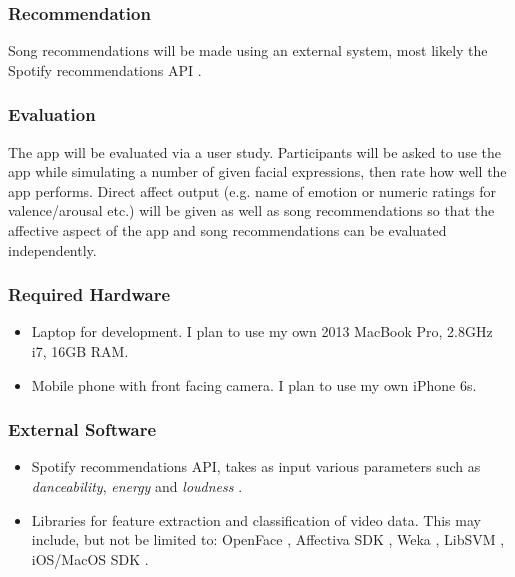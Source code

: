 \documentclass[11pt]{article}
\begin{document}
\begin{multicols}{2}
\subsubsection*{Recommendation}
Song recommendations will be made using an external system, most likely the Spotify recommendations API \cite{spotify}.

\subsubsection*{Evaluation} 
The app will be evaluated via a user study. Participants will be asked to use the app while simulating a number of given facial expressions, then rate how well the app performs. Direct affect output (e.g. name of emotion or numeric ratings for valence/arousal etc.) will be given as well as song recommendations so that the affective aspect of the app and song recommendations can be evaluated independently. 

\subsubsection*{Required Hardware}
\begin{itemize}[leftmargin=*]
\item{Laptop for development. I plan to use my own 2013 MacBook Pro, 2.8GHz i7, 16GB RAM.}
\item{Mobile phone with front facing camera. I plan to use my own iPhone 6s.}
\end{itemize}

\subsubsection*{External Software}
\begin{itemize}[leftmargin=*]
\item{Spotify recommendations API, takes as input various parameters such as \emph{danceability}, \emph{energy} and \emph{loudness} \cite{spotify}.}
\item{Libraries for feature extraction and classification of video data. This may include, but not be limited to: OpenFace \cite{openface}, Affectiva SDK \cite{affectiva}, Weka \cite{weka}, LibSVM \cite{libsvm}, iOS/MacOS SDK \cite{coreml}.}
\end{itemize}

{
}
\end{multicols}
\end{document}
